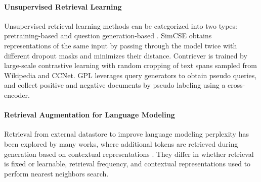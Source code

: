 \documentclass[11pt, dvipsnames]{article}
\begin{document}
\paragraph{Unsupervised Retrieval Learning}
Unsupervised retrieval learning methods can be categorized into two types: pretraining-based \cite{orqa-2019-lee,simcse-2021-gao,tsdae-2021-wang,condenser-2021-gao,contriver-2021-izacard} and question generation-based \cite{qgen-2021-ma,gpl-2021-wang}.
SimCSE \cite{simcse-2021-gao} obtains representations of the same input by passing through the model twice with different dropout masks and minimizes their distance.
Contriever \cite{contriver-2021-izacard} is trained by large-scale contrastive learning with random cropping of text spans sampled from Wikipedia and CCNet.
GPL \cite{gpl-2021-wang} leverages query generators to obtain pseudo queries, and collect positive and negative documents by pseudo labeling using a cross-encoder.

\paragraph{Retrieval Augmentation for Language Modeling}
Retrieval from external datastore to improve language modeling perplexity has been explored by many works, where additional tokens are retrieved during generation based on contextual representations \cite{knnlm-2020-khandelwal,retro-2021-retro,memtrans-2022-wu,trime-2022-zhong}.
They differ in whether retrieval is fixed or learnable, retrieval frequency, and contextual representations used to perform nearest neighbors search.
\end{document}
